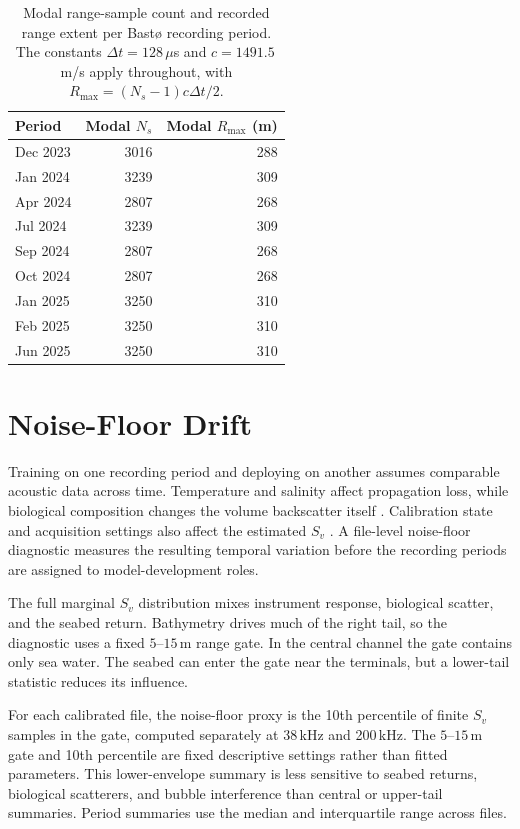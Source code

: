 \begin{table}[htbp]
\centering
\caption{Modal range-sample count and recorded range extent per Bast\o{} recording period. The constants $\Delta t=128\,\mu$s and $c=1491.5$\,m/s apply throughout, with $R_{\max} = (N_s - 1)c\Delta t/2$.}
\label{tab:acq-settings}
\begin{tabular}{lrr}
\toprule
Period & Modal $N_s$ & Modal $R_{\max}$ (m) \\
\midrule
Dec 2023      & 3016 & 288 \\
Jan 2024      & 3239 & 309 \\
Apr 2024      & 2807 & 268 \\
Jul 2024      & 3239 & 309 \\
Sep 2024      & 2807 & 268 \\
Oct 2024      & 2807 & 268 \\
Jan 2025      & 3250 & 310 \\
Feb 2025      & 3250 & 310 \\
Jun 2025      & 3250 & 310 \\
\bottomrule
\end{tabular}
\end{table}

\section{Noise-Floor Drift}
\label{sec:noise-floor}

Training on one recording period and deploying on another assumes comparable acoustic data across time. Temperature and salinity affect propagation loss, while biological composition changes the volume backscatter itself \cite{francois_sound_1982a,francois_sound_1982b,nerc_acoustic_volume_backscattering_strength}. Calibration state and acquisition settings also affect the estimated $S_v$ \cite{demer_calibration_2015,simrad_ek80_reference_2025}. A file-level noise-floor diagnostic measures the resulting temporal variation before the recording periods are assigned to model-development roles.

The full marginal $S_v$ distribution mixes instrument response, biological scatter, and the seabed return. Bathymetry drives much of the right tail, so the diagnostic uses a fixed $5$--$15$\,m range gate. In the central channel the gate contains only sea water. The seabed can enter the gate near the terminals, but a lower-tail statistic reduces its influence.

For each calibrated file, the noise-floor proxy is the 10th percentile of finite $S_v$ samples in the gate, computed separately at 38\,kHz and 200\,kHz. The $5$--$15$\,m gate and 10th percentile are fixed descriptive settings rather than fitted parameters. This lower-envelope summary is less sensitive to seabed returns, biological scatterers, and bubble interference than central or upper-tail summaries. Period summaries use the median and interquartile range across files.

